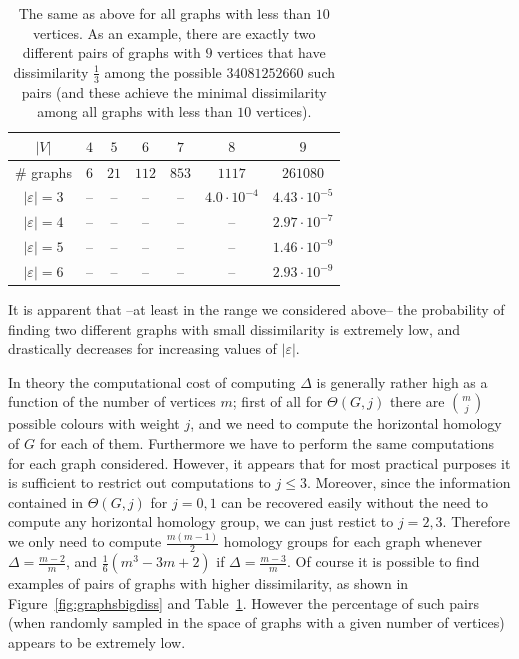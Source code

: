 \documentclass[11pt, a4paper, reqno, twoside, makeidx]{amsart}
\theoremstyle{remark}
\theoremstyle{plain}
\theoremstyle{definition}
\newcommand{\perc}[2]{#1 \cdot 10^{-#2}}
\begin{document}
\begin{table}[ht]
\begin{center}
\begin{tabular}{|c|c|c|c|c|c|c|}
\hline
$|V|$ & $4$ & $5$ & $6$ & $7$ & $8$ & $9$\\
\hline
\# graphs & $6$ & $21$ & $112$ & $853$ & $1117$ & $261080$\\
\hline
\hline
$|\varepsilon| = 3$ & -- & -- & -- & -- & $\perc{4.0}{4}$ & $ \perc{4.43}{5}$\\
\hline
$|\varepsilon| = 4$ & -- & -- & -- & -- & -- &  $ \perc{2.97}{7}$\\
\hline
$|\varepsilon| = 5$ & -- & -- & -- & -- & -- & $ \perc{1.46}{9}$\\
\hline
$|\varepsilon| = 6$ & -- & -- & -- & -- & -- & $\perc{2.93}{9}$\\
\hline
\end{tabular}
\vspace{0.3cm}
\caption{The same as above for all graphs with less than $10$ vertices. As an example, there are exactly two different pairs of graphs with $9$ vertices that have dissimilarity $\frac{1}{3}$ among the possible $34081252660$ such pairs (and these achieve the minimal dissimilarity among all graphs with less than $10$ vertices).}
\label{tab:data}
\end{center}
\end{table}
It is apparent that --at least in the range we considered above-- the probability of finding two different graphs with small dissimilarity is extremely low, and drastically decreases for increasing values of $|\varepsilon|$.

In theory the computational cost of computing $\Delta$ is generally rather high as a function of the number of vertices $m$; first of all for $\Theta(G,j)$ there are $\binom{m}{j}$ possible colours with weight $j$, and we need to compute the horizontal homology of $G$ for each of them. Furthermore we have to perform the same computations for each graph considered. 
However, it appears that for most practical purposes it is sufficient to restrict out computations to $j\le 3$. Moreover, since the information contained in $\Theta(G,j)$ for $j = 0,1$ can be recovered easily without the need to compute any horizontal homology group, we can just restict to $j=2,3$. Therefore we only need to compute $\frac{m(m-1)}{2}$ homology groups for each graph whenever $\Delta = \frac{m-2}{m}$, and $\frac{1}{6}(m^3 - 3m +2)$ if $\Delta = \frac{m-3}{m}$. Of course it is possible to find examples of pairs of graphs with higher dissimilarity, as shown in Figure~\ref{fig:graphsbigdiss} and Table~\ref{tab:data}. However the percentage of such pairs (when randomly sampled in the space of graphs with a given number of vertices) appears to be extremely low.
\end{document}
